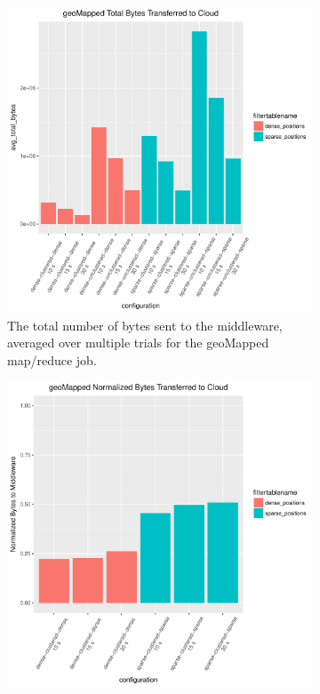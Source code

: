 \documentclass{thesis}
\begin{document}
    \begin{figure}
        \begin{subfigure}[h]{0.45\textwidth}
            \centering
            \includegraphics[width=\textwidth]{binImages/geoMapped-runplot.pdf}
            \caption{The total number of bytes sent to the middleware,
            averaged over multiple trials for the geoMapped map/reduce job.}
        \end{subfigure}
        \begin{subfigure}[h]{0.45\textwidth}
            \centering
            \includegraphics[width=\textwidth]{binImages/geoMapped-runplot-normalized.pdf}

\end{subfigure}
\end{figure}
\end{document}
